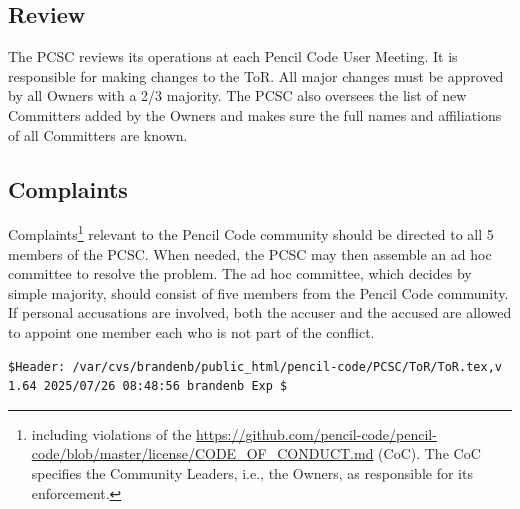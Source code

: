 \documentclass{article}
\begin{document}
\subsection{Review}

The PCSC reviews its operations at each Pencil Code User Meeting.
It is responsible for making changes to the ToR.
All major changes must be approved by all Owners with a 2/3 majority.
The PCSC also oversees the list of new Committers added by the Owners and makes
sure the full names and affiliations of all Committers are known.

\subsection{Complaints}

Complaints\footnote{including violations of the
\url{https://github.com/pencil-code/pencil-code/blob/master/license/CODE_OF_CONDUCT.md}
(CoC). The CoC specifies the Community Leaders, i.e., the Owners, as
responsible for its enforcement.} relevant to the Pencil Code community should be
directed to all 5 members of the PCSC.
When needed, the PCSC may then assemble an ad hoc committee
to resolve the problem.
The ad hoc committee, which decides by simple majority,
should consist of five members from the Pencil Code community.
If personal accusations are involved, both the accuser and the
accused are allowed to appoint one member each who is not part of the conflict.

\vfill\bigskip\noindent\tiny\begin{verbatim}
$Header: /var/cvs/brandenb/public_html/pencil-code/PCSC/ToR/ToR.tex,v 1.64 2025/07/26 08:48:56 brandenb Exp $
\end{verbatim}
\end{document}
